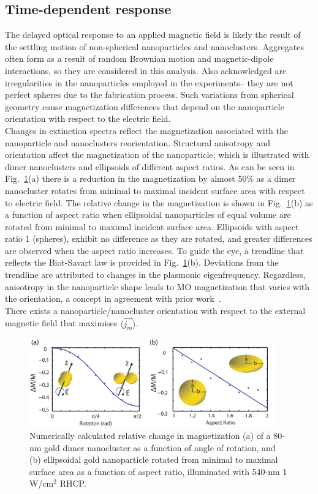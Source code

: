 \subsection{Time-dependent response}
\indent The delayed optical response to an applied magnetic field is likely the result of the settling motion of non-spherical nanoparticles and nanoclusters. Aggregates often form as a result of random Brownian motion and magnetic-dipole interactions, so they are considered in this analysis. Also acknowledged are irregularities in the nanoparticles employed in the experiments-- they are not perfect spheres due to the fabrication process. Such variations from spherical geometry cause magnetization differences that depend on the nanoparticle orientation with respect to the electric field.
\\\indent Changes in extinction spectra reflect the magnetization associated with the nanoparticle and nanoclusters reorientation. Structural anisotropy and orientation affect the magnetization of the nanoparticle, which is illustrated with dimer nanoclusters and ellipsoids of different aspect ratios. As can be seen in Fig.~\ref{Dimer}(a) there is a reduction in the magnetization by almost 50\% as a dimer nanocluster rotates from minimal to maximal incident surface area with respect to electric field.
 The relative change in the magnetization is shown in Fig.~\ref{Dimer}(b) as a function of aspect ratio when ellipsoidal nanoparticles of equal volume are rotated from minimal to maximal incident surface area. Ellipsoids with aspect ratio 1 (spheres), exhibit no difference as they are rotated, and greater differences are observed when the aspect ratio increases. To guide the eye, a trendline that reflects the Biot-Savart law is provided in Fig.~\ref{Dimer}(b). Deviations from the trendline are attributed to changes in the plasmonic eigenfrequency. Regardless, anisotropy in the nanoparticle shape leads to MO magnetization that varies with the orientation, a concept in agreement with prior work~\cite{Jain,Funston}. 
\\\indent %
There exists a nanoparticle/nanocluster orientation with respect to the external magnetic field that maximises $\langle\vec{j_m}\rangle$. 
\begin{figure}[t]
\centering
\includegraphics[width=0.95\textwidth]{MagPlots}
\caption{Numerically calculated relative change in magnetization (a) of a 80-nm gold dimer nanocluster as a function of angle of rotation, and (b) ellipsoidal gold nanoparticle rotated from minimal to maximal surface area as a function of aspect ratio, illuminated with 540-nm 1 W/cm$^2$ RHCP.}
\label{Dimer}
\end{figure}
